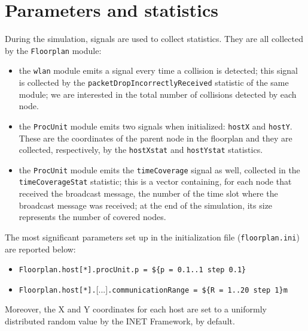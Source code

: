 \section{Parameters and statistics}
During the simulation, signals are used to collect statistics. They are all
collected by the \texttt{Floorplan} module:
\begin{itemize}
    \item the \texttt{wlan} module emits a signal every time a collision is
    detected; this signal is collected by the
    \texttt{packetDropIncorrectlyReceived} statistic of the same module; we are
    interested in the total number of collisions detected by each node.
    \item the \texttt{ProcUnit} module emits two signals when initialized:
    \texttt{hostX} and \texttt{hostY}. These are the coordinates of the parent node in the floorplan and they are collected, respectively, by the
    \texttt{hostXstat} and \texttt{hostYstat} statistics.
    \item the \texttt{ProcUnit} module emits the \texttt{timeCoverage} signal as
    well, collected in the \texttt{timeCoverageStat} statistic; this is a
    vector containing, for each node that received the broadcast message, the
    number of the time slot where the broadcast message was received; at
    the end of the simulation, its size represents the number of covered nodes.
\end{itemize}
The most significant parameters set up in the initialization file
	(\texttt{floorplan.ini}) are reported below:
\begin{itemize}
    \item \texttt{Floorplan.host[*].procUnit.p = \$\{p = 0.1..1 step 0.1\}}
    \item \texttt{Floorplan.host[*].}[...]\texttt{.communicationRange = \$\{R = 1..20 step 1\}m}
\end{itemize}

Moreover, the X and Y coordinates for each host are set to a uniformly distributed random value by the INET Framework, by default.

